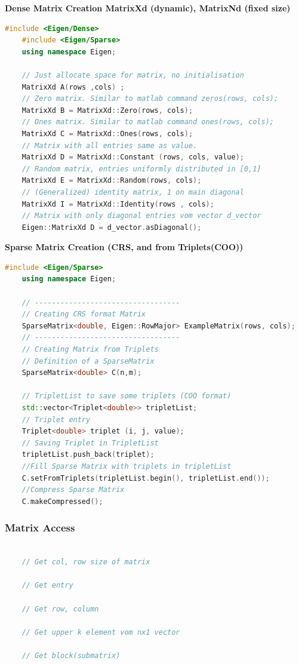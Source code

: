 \documentclass[12pt, a4paper]{article}
\begin{document}
\textbf{Dense Matrix Creation \hspace{20mm} \color{blue}MatrixXd (dynamic), MatrixNd (fixed size)}

\begin{lstlisting}[language=C++, caption=Initializing dense matrices]
	#include <Eigen/Dense>
	#include <Eigen/Sparse>
	using namespace Eigen;
	
	// Just allocate space for matrix, no initialisation
	MatrixXd A(rows ,cols) ;
	// Zero matrix. Similar to matlab command zeros(rows, cols);
	MatrixXd B = MatrixXd::Zero(rows, cols);
	// Ones matrix. Similar to matlab command ones(rows, cols);
	MatrixXd C = MatrixXd::Ones(rows, cols);
	// Matrix with all entries same as value.
	MatrixXd D = MatrixXd::Constant (rows, cols, value);
	// Random matrix, entries uniformly distributed in [0,1]
	MatrixXd E = MatrixXd::Random(rows, cols);
	// (Generalized) identity matrix, 1 on main diagonal
	MatrixXd I = MatrixXd::Identity(rows , cols);
	// Matrix with only diagonal entries vom vector d_vector
	Eigen::MatrixXd D = d_vector.asDiagonal();
\end{lstlisting}

\textbf{Sparse Matrix Creation (CRS, and from Triplets(COO))}
\begin{lstlisting}[language=C++, caption=sparse matrix creation]
	#include <Eigen/Sparse>
	using namespace Eigen;
	
	// ----------------------------------
	// Creating CRS format Matrix
	SparseMatrix<double, Eigen::RowMajor> ExampleMatrix(rows, cols); 
	// ----------------------------------
	// Creating Matrix from Triplets
	// Definition of a SparseMatrix
	SparseMatrix<double> C(n,m);

	// TripletList to save some triplets (COO format)
	std::vector<Triplet<double>> tripletList;
	// Triplet entry
	Triplet<double> triplet (i, j, value); 	 
	// Saving Triplet in TripletList
	tripletList.push_back(triplet);
	//Fill Sparse Matrix with triplets in tripletList
	C.setFromTriplets(tripletList.begin(), tripletList.end());
	//Compress Sparse Matrix
	C.makeCompressed();
\end{lstlisting}



\subsubsection{Matrix Access}
\begin{lstlisting}[language=C++, caption=matrix manipulation]
	
	// Get col, row size of matrix
	
	// Get entry
	
	// Get row, column
	
	// Get upper k element vom nx1 vector
	
	// Get block(submatrix)
	
	
\end{lstlisting}
\end{document}
